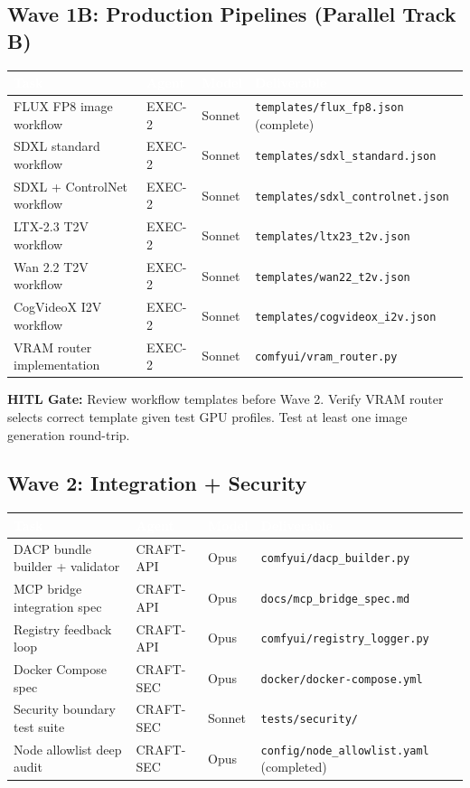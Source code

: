 \documentclass[11pt,letterpaper]{article}
\newcommand{\tableheader}[1]{\textbf{\sffamily\textcolor{white}{#1}}}
\begin{document}
\subsection{Wave 1B: Production Pipelines (Parallel Track B)}

\begin{center}
\begin{tabularx}{\textwidth}{L{4.5cm}L{2cm}L{1.8cm}X}
\toprule
{}
\tableheader{Task} & \tableheader{Agent} & \tableheader{Model} & \tableheader{Deliverable} \\
\midrule
FLUX FP8 image workflow & EXEC-2 & Sonnet & \texttt{templates/flux\_fp8.json} (complete) \\
SDXL standard workflow & EXEC-2 & Sonnet & \texttt{templates/sdxl\_standard.json} \\
SDXL + ControlNet workflow & EXEC-2 & Sonnet & \texttt{templates/sdxl\_controlnet.json} \\
LTX-2.3 T2V workflow & EXEC-2 & Sonnet & \texttt{templates/ltx23\_t2v.json} \\
Wan 2.2 T2V workflow & EXEC-2 & Sonnet & \texttt{templates/wan22\_t2v.json} \\
CogVideoX I2V workflow & EXEC-2 & Sonnet & \texttt{templates/cogvideox\_i2v.json} \\
VRAM router implementation & EXEC-2 & Sonnet & \texttt{comfyui/vram\_router.py} \\
\bottomrule
\end{tabularx}
\end{center}

\textbf{HITL Gate:} Review workflow templates before Wave 2. Verify VRAM router selects
correct template given test GPU profiles. Test at least one image generation round-trip.

\subsection{Wave 2: Integration + Security}

\begin{center}
\begin{tabularx}{\textwidth}{L{4.5cm}L{2cm}L{1.8cm}X}
\toprule
{}
\tableheader{Task} & \tableheader{Agent} & \tableheader{Model} & \tableheader{Deliverable} \\
\midrule
DACP bundle builder + validator & CRAFT-API & Opus & \texttt{comfyui/dacp\_builder.py} \\
MCP bridge integration spec & CRAFT-API & Opus & \texttt{docs/mcp\_bridge\_spec.md} \\
Registry feedback loop & CRAFT-API & Opus & \texttt{comfyui/registry\_logger.py} \\
Docker Compose spec & CRAFT-SEC & Opus & \texttt{docker/docker-compose.yml} \\
Security boundary test suite & CRAFT-SEC & Sonnet & \texttt{tests/security/} \\
Node allowlist deep audit & CRAFT-SEC & Opus & \texttt{config/node\_allowlist.yaml} (completed) \\
\bottomrule
\end{tabularx}
\end{center}
\end{document}
